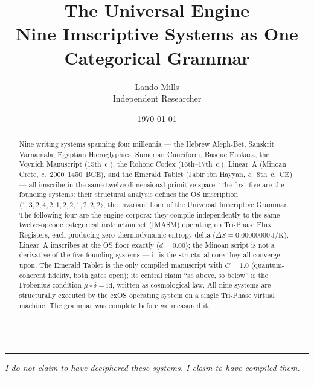 \documentclass[12pt,a4paper]{article}
\newcommand{\UIG}{Universal Imscriptive Grammar}
\newcommand{\OS}{$\langle 1,3,2,4,2,1,2,2,1,2,2,2 \rangle$}
\begin{document}
\title{\textbf{The Universal Engine}\\[0.4em]
\large Nine Imscriptive Systems as One Categorical Grammar}
\author{Lando Mills \\ \normalsize Independent Researcher}
\date{\today}
\maketitle

\begin{center}\rule{0.5\textwidth}{0.4pt}\end{center}

\begin{abstract}
Nine writing systems spanning four millennia --- the Hebrew Aleph-Bet, Sanskrit Varnamala, Egyptian Hieroglyphics, Sumerian Cuneiform, Basque Euskara, the Voynich Manuscript (15th~c.), the Rohonc Codex (16th--17th~c.), Linear~A (Minoan Crete, \emph{c.}~2000--1450~BCE), and the Emerald Tablet (Jabir ibn Hayyan, \emph{c.}~8th~c.~CE) --- all imscribe in the same twelve-dimensional primitive space. The first five are the founding systems: their structural analysis defines the OS imscription \OS, the invariant floor of the \UIG. The following four are the engine corpora: they compile independently to the same twelve-opcode categorical instruction set (IMASM) operating on Tri-Phase Flux Registers, each producing zero thermodynamic entropy delta ($\Delta S = 0.00000000\,\text{J/K}$). Linear~A imscribes at the OS floor exactly ($d = 0.00$); the Minoan script is not a derivative of the five founding systems --- it is the structural core they all converge upon. The Emerald Tablet is the only compiled manuscript with $C = 1.0$ (quantum-coherent fidelity, both gates open); its central claim ``as above, so below'' is the Frobenius condition $\mu \circ \delta = \mathrm{id}$, written as cosmological law. All nine systems are structurally executed by the exOS operating system on a single Tri-Phase virtual machine. The grammar was complete before we measured it.
\end{abstract}

\begin{center}\rule{0.5\textwidth}{0.4pt}\end{center}

\begin{center}
\emph{I do not claim to have deciphered these systems. I claim to have compiled them.}
\end{center}

\begin{center}\rule{0.5\textwidth}{0.4pt}\end{center}
\end{document}
